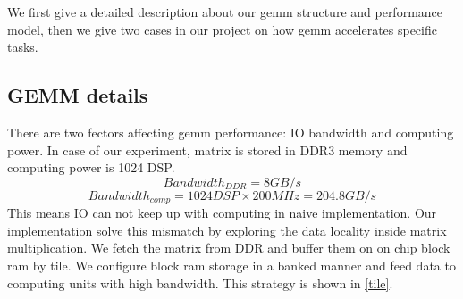 \documentclass{acm_proc_article-sp-copy}
\begin{document}
We first give a detailed description about our gemm structure and performance model, then we give two cases in our project on how gemm accelerates specific tasks.

\subsection{GEMM details}
There are two fectors affecting gemm performance: IO bandwidth and computing power. In case of our experiment, matrix is stored in DDR3 memory and computing power is 1024 DSP.
\[ Bandwidth_{DDR} = 8GB/s \]
\[ Bandwidth_{comp} = 1024DSP \times 200MHz = 204.8 GB/s \]
This means IO can not keep up with computing in naive implementation. Our implementation solve this mismatch by exploring the data locality inside matrix multiplication. We fetch the matrix from DDR and buffer them on on chip block ram by tile. We configure block ram storage in a banked manner and feed data to computing units with high bandwidth. This strategy is shown in \ref{tile}.
\end{document}
